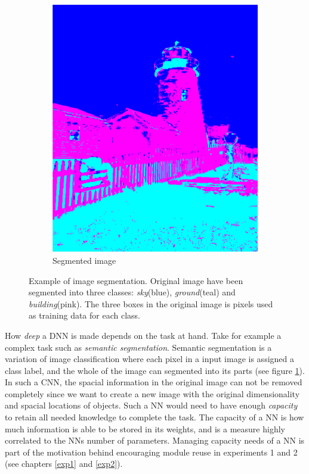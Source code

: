 \begin{figure}
    \hfill
    \begin{subfigure}[h]{0.49\linewidth}
        \includegraphics[width=\linewidth]{Chapters/2.Background/figures/segmentation.png}
        \caption{Segmented image}
    \end{subfigure}
    \caption[Image segmentation]{Example of image segmentation. Original image have been segmented into three classes: \textit{sky}(blue), \textit{ground}(teal) and \textit{building}(pink). The three boxes in the original image is pixels used as training data for each class.}
    \label{fig:semanticsegmentation}
\end{figure}

How \textit{deep} a DNN is made depends on the task at hand. Take for example a complex task such as \textit{semantic segmentation}. Semantic segmentation is a variation of image classification where each pixel in a input image is assigned a class label, and the whole of the image can segmented into its parts (see figure \ref{fig:semanticsegmentation}). In such a CNN, the spacial information in the original image can not be removed completely since we want to create a new image with the original dimensionality and spacial locations of objects. Such a NN would need to have enough \textit{capacity} to retain all needed knowledge to complete the task. The capacity of a NN is how much information is able to be stored in its weights, and is a measure highly correlated to the NNs number of parameters. Managing capacity needs of a NN is part of the motivation behind encouraging module reuse in experiments 1 and 2 (see chapters \ref{exp1} and \ref{exp2}).


